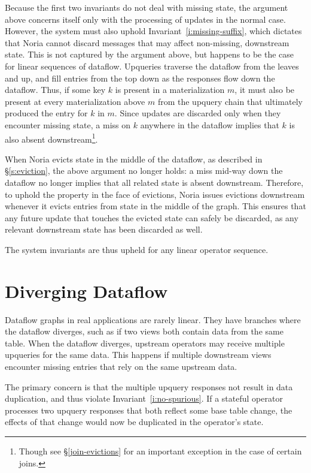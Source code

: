 Because the first two invariants do not deal with missing state, the argument
above concerns itself only with the processing of updates in the normal case.
However, the system must also uphold Invariant~\ref{i:missing-suffix}, which
dictates that Noria cannot discard messages that may affect non-missing,
downstream state. This is not captured by the argument above, but happens to be
the case for linear sequences of dataflow. Upqueries traverse the dataflow from
the leaves and up, and fill entries from the top down as the responses flow down
the dataflow. Thus, if some key $k$ is present in a materialization $m$, it must
also be present at every materialization above $m$ from the upquery chain that
ultimately produced the entry for $k$ in $m$. Since updates are discarded only
when they encounter missing state, a miss on $k$ anywhere in the dataflow
implies that $k$ is also absent downstream\footnote{Though see
\S\ref{join-evictions} for an important exception in the case of certain
joins.}.

When Noria evicts state in the middle of the dataflow, as described in
\S\ref{s:eviction}, the above argument no longer holds: a miss mid-way down the
dataflow no longer implies that all related state is absent downstream.
Therefore, to uphold the property in the face of evictions, Noria issues
evictions downstream whenever it evicts entries from state in the middle of the
graph. This ensures that any future update that touches the evicted state can
safely be discarded, as any relevant downstream state has been discarded as
well.

The system invariants are thus upheld for any linear operator sequence.

\section{Diverging Dataflow}
\label{s:partial:diverging}

Dataflow graphs in real applications are rarely linear. They have branches where
the dataflow diverges, such as if two views both contain data from the same
table. When the dataflow diverges, upstream operators may receive multiple
upqueries for the same data. This happens if multiple downstream views encounter
missing entries that rely on the same upstream data.

The primary concern is that the multiple upquery responses not result in data
duplication, and thus violate Invariant~\ref{i:no-spurious}. If a stateful
operator processes two upquery responses that both reflect some base table
change, the effects of that change would now be duplicated in the operator's
state.

